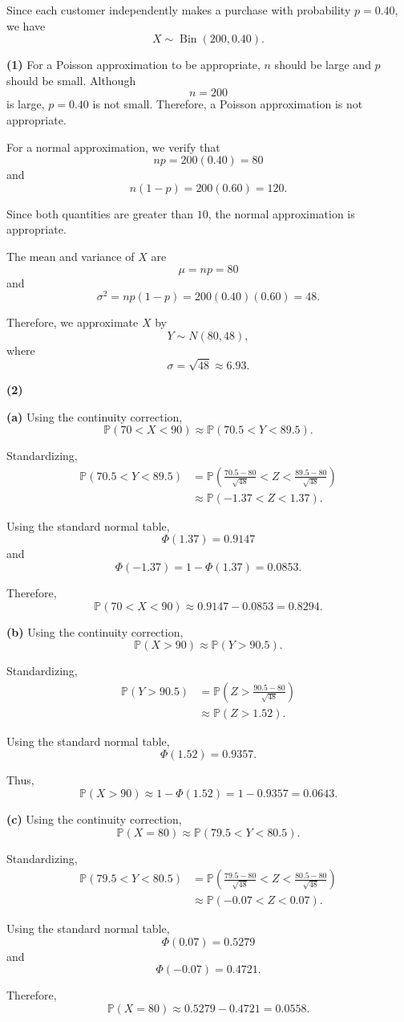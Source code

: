 \documentclass[11pt]{article}
\begin{document}
\begin{solutionbox}

Since each customer independently makes a purchase with probability
\(p=0.40\), we have
\[
X\sim\operatorname{Bin}(200,0.40).
\]

\textbf{(1)} For a Poisson approximation to be appropriate, \(n\) should be large and
\(p\) should be small. Although
\[
n=200
\]
is large, \(p=0.40\) is not small. Therefore, a Poisson approximation is
not appropriate.

For a normal approximation, we verify that
\[
np=200(0.40)=80
\]
and
\[
n(1-p)=200(0.60)=120.
\]

Since both quantities are greater than \(10\), the normal approximation is
appropriate.

The mean and variance of \(X\) are
\[
\mu=np=80
\]
and
\[
\sigma^2=np(1-p)=200(0.40)(0.60)=48.
\]

Therefore, we approximate \(X\) by
\[
Y\sim N(80,48),
\]
where
\[
\sigma=\sqrt{48}\approx6.93.
\]


\textbf{(2)}

\textbf{(a)} Using the continuity correction,
\[
\mathbb{P}(70<X<90)
\approx
\mathbb{P}(70.5<Y<89.5).
\]

Standardizing,
\[
\begin{aligned}
\mathbb{P}(70.5<Y<89.5)
&=
\mathbb{P}\left(
\frac{70.5-80}{\sqrt{48}}
<
Z
<
\frac{89.5-80}{\sqrt{48}}
\right)\\
&\approx
\mathbb{P}(-1.37<Z<1.37).
\end{aligned}
\]

Using the standard normal table,
\[
\Phi(1.37)=0.9147
\]
and
\[
\Phi(-1.37)=1-\Phi(1.37)=0.0853.
\]

Therefore,
\[
\mathbb{P}(70<X<90)
\approx
0.9147-0.0853
=
0.8294.
\]


\textbf{(b)} Using the continuity correction,
\[
\mathbb{P}(X>90)
\approx
\mathbb{P}(Y>90.5).
\]

Standardizing,
\[
\begin{aligned}
\mathbb{P}(Y>90.5)
&=
\mathbb{P}\left(
Z>
\frac{90.5-80}{\sqrt{48}}
\right)\\
&\approx
\mathbb{P}(Z>1.52).
\end{aligned}
\]

Using the standard normal table,
\[
\Phi(1.52)=0.9357.
\]

Thus,
\[
\mathbb{P}(X>90)
\approx
1-\Phi(1.52)
=
1-0.9357
=
0.0643.
\]


\textbf{(c)} Using the continuity correction,
\[
\mathbb{P}(X=80)
\approx
\mathbb{P}(79.5<Y<80.5).
\]

Standardizing,
\[
\begin{aligned}
\mathbb{P}(79.5<Y<80.5)
&=
\mathbb{P}\left(
\frac{79.5-80}{\sqrt{48}}
<
Z
<
\frac{80.5-80}{\sqrt{48}}
\right)\\
&\approx
\mathbb{P}(-0.07<Z<0.07).
\end{aligned}
\]

Using the standard normal table,
\[
\Phi(0.07)=0.5279
\]
and
\[
\Phi(-0.07)=0.4721.
\]

Therefore,
\[
\mathbb{P}(X=80)
\approx
0.5279-0.4721
=
0.0558.
\]

\end{solutionbox}
 
 
\end{document}
